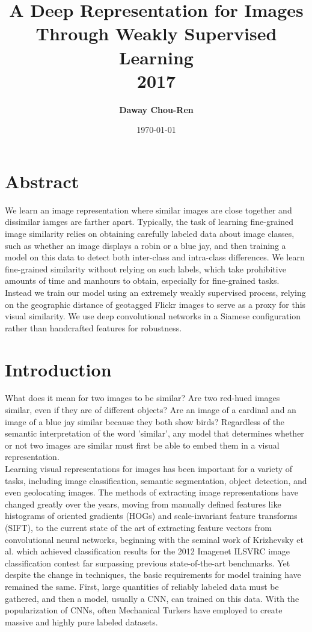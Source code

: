\documentclass[pageno]{jpaper}
\title{\bf A Deep Representation for Images Through Weakly Supervised Learning\\[2ex] 
       \rm\normalsize 2017}
\date{\today}
\author{\bf Daway Chou-Ren}
\begin{document}
\maketitle

\thispagestyle{empty}
\doublespacing

\section{Abstract}
We learn an image representation where similar images are close together and dissimilar iamges are farther apart. Typically, the task of learning fine-grained image similarity relies on obtaining carefully labeled data about image classes, such as whether an image displays a robin or a blue jay, and then training a model on this data to detect both inter-class and intra-class differences. We learn fine-grained similarity without relying on such labels, which take prohibitive amounts of time and manhours to obtain, especially for fine-grained tasks. Instead we train our model using an extremely weakly supervised process, relying on the geographic distance of geotagged Flickr images to serve as a proxy for this visual similarity. We use deep convolutional networks in a Siamese configuration rather than handcrafted features for robustness. 

\section{Introduction}
What does it mean for two images to be similar? Are two red-hued images similar, even if they are of different objects? Are an image of a cardinal and an image of a blue jay similar because they both show birds? Regardless of the semantic interpretation of the word 'similar', any model that determines whether or not two images are similar must first be able to embed them in a visual representation.\\

Learning visual representations for images has been important for a variety of tasks, including image classification, semantic segmentation, object detection, and even geolocating images. The methods of extracting image representations have changed greatly over the years, moving from manually defined features like histograms of oriented gradients (HOGs) and scale-invariant feature transforms (SIFT)\cite{lowe1999object}\cite{dalal2005histograms}, to the current state of the art of extracting feature vectors from convolutional neural networks, beginning with the seminal work of Krizhevsky et al. which achieved classification results for the 2012 Imagenet ILSVRC image classification contest far surpassing previous state-of-the-art benchmarks\cite{krizhevsky2012imagenet}. Yet despite the change in techniques, the basic requirements for model training have remained the same. First, large quantities of reliably labeled data must be gathered, and then a model, usually a CNN, can trained on this data. With the popularization of CNNs, often Mechanical Turkers have employed to create massive and highly pure labeled datasets.\\
\end{document}
